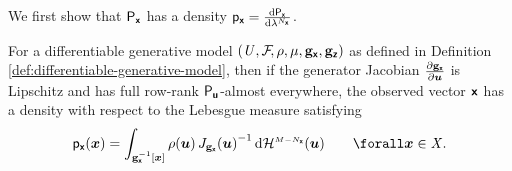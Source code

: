 We first show that $\mathsf{P}_{\boldsymbol{\mathsf{x}}}$ has a density $\pden{\rvct{x}} = \td{\prob{\rvct{x}}}{\lebm{N_{\rvct{x}}}}$.

\begin{proposition}
For a differentiable generative model $(\mathit{U},\mathcal{F}\kern-2pt,\rho,\mu,{\mathbf{g}}_{\boldsymbol{\mathsf{x}}},{\mathbf{g}}_{\boldsymbol{\mathsf{z}}})$ as defined in Definition \ref{def:differentiable-generative-model}, then if the generator Jacobian $\frac{\partial {\mathbf{g}}_{\boldsymbol{\mathsf{x}}}}{\partial \boldsymbol{u}}$ is Lipschitz and has full row-rank $\mathsf{P}_{\boldsymbol{\mathsf{u}}}$-almost everywhere, the observed vector $\boldsymbol{\mathsf{x}}$ has a density with respect to the Lebesgue measure satisfying
\begin{equation}\label{eq:dgm-marginal-density-x}
  \pden{\rvct{x}}({\vct{x}})  =
  \int_{\genfunc_{\rvct{x}}^{-1}[\vct{x}]}
    \rho(\vct{u})\,
    \jacobproddet{\genfunc_{\rvct{x}}}{\vct{u}}^{-1}
  \,\dr\haum{M-N_{\rvct{x}}}(\vct{u})
  \qquad \forall \vct{x} \in\set{X}.
\end{equation}
\end{proposition}
